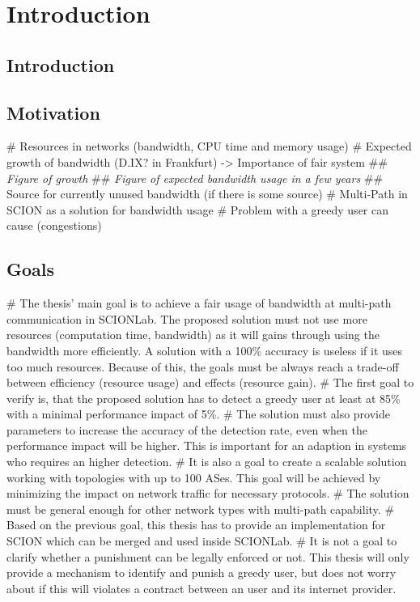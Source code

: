 \documentclass[thesis.tex]{subfiles}
\begin{document}
\chapter{Introduction}
\label{chap:introduction}


\section{Introduction}

\section{Motivation}

\begin{easylist}
    \MyListProperties
    # Resources in networks (bandwidth, CPU time and memory usage)
    # Expected growth of bandwidth (D.IX? in Frankfurt) -> Importance of fair system
    ## \textit{Figure of growth}
    ## \textit{Figure of expected bandwidth usage in a few years}
    ## Source for currently unused bandwidth (if there is some source)
    # Multi-Path in SCION as a solution for bandwidth usage
    # Problem with a greedy user can cause (congestions)
\end{easylist}

\section{Goals} \label{bib:goals}
     \begin{easylist}
        \MyListProperties        
        # The thesis' main goal is to achieve a fair usage of bandwidth at multi-path communication in SCIONLab. The proposed solution must not use more resources (computation time, bandwidth) as it will gains through using the bandwidth more efficiently. A solution with a 100\% accuracy is useless if it uses too much resources. Because of this, the goals must be always reach a trade-off between efficiency (resource usage) and effects (resource gain).        
        # The first goal to verify is, that the proposed solution has to detect a greedy user at least at 85\% with a minimal performance impact of 5\%.         
        # The solution must also provide parameters to increase the accuracy of the detection rate, even when the performance impact will be higher. This is important for an adaption in systems who requires an higher detection.
        # It is also a goal to create a scalable solution working with topologies with up to 100 ASes. This goal will be achieved by minimizing the impact on network traffic for necessary protocols.        
        # The solution must be general enough for other network types with multi-path capability.        
        # Based on the previous goal, this thesis has to provide an implementation for SCION which can be merged and used inside SCIONLab.
        # It is not a goal to clarify whether a punishment can be legally enforced or not. This thesis will only provide a mechanism to identify and punish a greedy user, but does not worry about if this will violates a contract between an user and its internet provider.
    \end{easylist}
\end{document}
